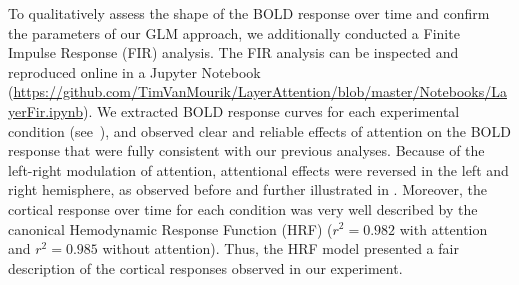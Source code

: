 \documentclass[9pt,lineno]{aperture}
\begin{document}
To  qualitatively assess the shape of the BOLD response over time and confirm the parameters of our GLM approach, we additionally conducted a Finite Impulse Response (FIR) analysis. The FIR analysis can be inspected and reproduced online in a Jupyter Notebook (\url{https://github.com/TimVanMourik/LayerAttention/blob/master/Notebooks/LayerFir.ipynb}). We extracted BOLD response curves for each experimental condition (see~), and observed clear and reliable effects of attention on the BOLD response that were fully consistent with our previous analyses. Because of the left-right modulation of attention, attentional effects were reversed in the left and right hemisphere, as observed before and further illustrated in . Moreover, the cortical response over time for each condition was very well described by the canonical Hemodynamic Response Function (HRF) ($r^2=0.982$ with attention and $r^2=0.985$ without attention). Thus, the HRF model presented a fair description of the cortical responses observed in our experiment. 
\end{document}
